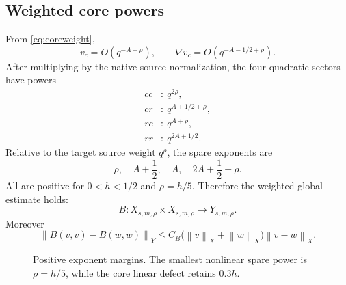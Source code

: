 \documentclass[11pt]{article}
\numberwithin{equation}{section}
\newcommand{\norm}[1]{\left\lVert #1\right\rVert}
\begin{document}
\subsection{Weighted core powers}
From \eqref{eq:coreweight},
\begin{equation}
v_c=O(q^{-A+\rho}),
\qquad
\nabla v_c=O(q^{-A-1/2+\rho}).
\label{eq:vscale}
\end{equation}
After multiplying by the native source normalization, the four quadratic sectors have powers
\begin{align}
cc&:\ q^{2\rho},\label{eq:cc}\\
cr&:\ q^{A+1/2+\rho},\label{eq:cr}\\
rc&:\ q^{A+\rho},\label{eq:rc}\\
rr&:\ q^{2A+1/2}.\label{eq:rr}
\end{align}
Relative to the target source weight \(q^\rho\), the spare exponents are
\begin{equation}
\boxed{
\rho,
\quad
A+\frac12,
\quad
A,
\quad
2A+\frac12-\rho.}
\label{eq:margins}
\end{equation}
All are positive for \(0<h<1/2\) and \(\rho=h/5\).  Therefore the weighted global estimate holds:
\begin{equation}
\boxed{
B:X_{s,m,\rho}\times X_{s,m,\rho}\to Y_{s,m,\rho}.}
\label{eq:weightedB}
\end{equation}
Moreover
\begin{equation}
\norm{B(v,v)-B(w,w)}_Y
\le C_B\bigl(\norm v_X+\norm w_X\bigr)\norm{v-w}_X.
\label{eq:Blip}
\end{equation}

\begin{figure}[ht]
\centering
{}
\caption{Positive exponent margins.  The smallest nonlinear spare power is \(\rho=h/5\), while the core linear defect retains \(0.3h\).}
\label{fig:margins}
\end{figure}
\end{document}
